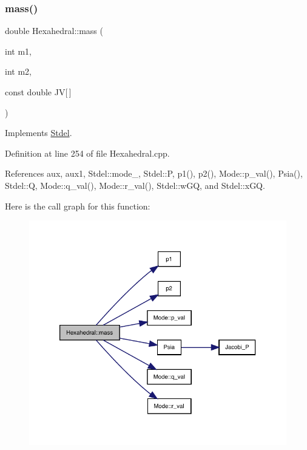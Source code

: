 \subsubsection{\texorpdfstring{mass()}{mass()}}
{\footnotesize\ttfamily double Hexahedral\+::mass (\begin{DoxyParamCaption}\item[{int}]{m1,  }\item[{int}]{m2,  }\item[{const double}]{JV\mbox{[}$\,$\mbox{]} }\end{DoxyParamCaption})\hspace{0.3cm}{\ttfamily [virtual]}}



Implements \hyperlink{classStdel_ab475cc8bc82a3b8a5200d4d841ef0a51}{Stdel}.



Definition at line 254 of file Hexahedral.\+cpp.



References aux, aux1, Stdel\+::mode\+\_\+, Stdel\+::P, p1(), p2(), Mode\+::p\+\_\+val(), Psia(), Stdel\+::Q, Mode\+::q\+\_\+val(), Mode\+::r\+\_\+val(), Stdel\+::w\+GQ, and Stdel\+::x\+GQ.

Here is the call graph for this function\+:
\nopagebreak
\begin{figure}[H]
\begin{center}
\leavevmode
\includegraphics[width=333pt]{classHexahedral_a8a25a3772962f7cb6d2f8c6b6871c0d1_cgraph}
\end{center}
\end{figure}
\mbox{\label{classStdel_a4fb0a049dc27d8e67665a56d1b5a18ba}} 
